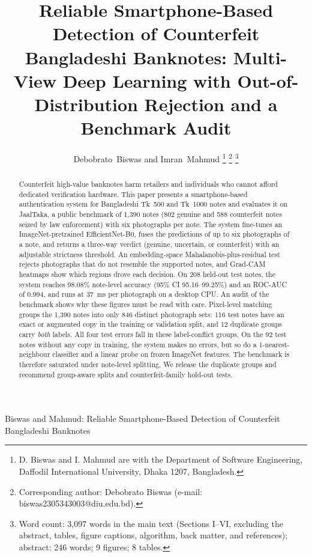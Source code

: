 \documentclass[journal]{IEEEtran}
\begin{document}
\title{Reliable Smartphone-Based Detection of Counterfeit Bangladeshi Banknotes:
Multi-View Deep Learning with Out-of-Distribution Rejection and a Benchmark Audit}

\author{Debobrato~Biswas and Imran~Mahmud%
\thanks{D. Biswas and I. Mahmud are with the Department of Software Engineering,
Daffodil International University, Dhaka 1207, Bangladesh.}%
\thanks{Corresponding author: Debobrato Biswas (e-mail: biswas2305343003@diu.edu.bd).}%
\thanks{Word count: 3{,}097 words in the main text (Sections I--VI, excluding the
abstract, tables, figure captions, algorithm, back matter, and references); abstract:
246 words; 9 figures; 8 tables.}}

%
{Biswas and Mahmud: Reliable Smartphone-Based Detection of Counterfeit Bangladeshi Banknotes}

\maketitle

\begin{abstract}
Counterfeit high-value banknotes harm retailers and individuals who cannot afford
dedicated verification hardware. This paper presents a smartphone-based authentication
system for Bangladeshi Tk~500 and Tk~1000 notes and evaluates it on JaalTaka, a public
benchmark of 1{,}390 notes (802 genuine and 588 counterfeit notes seized by law
enforcement) with six photographs per note. The system fine-tunes an ImageNet-pretrained
EfficientNet-B0, fuses the predictions of up to six photographs of a note, and returns
a three-way verdict (genuine, uncertain, or counterfeit) with an adjustable strictness
threshold. An embedding-space Mahalanobis-plus-residual test rejects
photographs that do not resemble the supported notes, and Grad-CAM heatmaps show which
regions drove each decision. On 208 held-out test notes, the system reaches 98.08\%
note-level accuracy (95\% CI 95.16--99.25\%) and an ROC-AUC of 0.994, and runs at
37~ms per photograph on a desktop CPU. An audit of the benchmark shows why these figures
must be read with care. Pixel-level matching groups the 1{,}390 notes into only 846
distinct photograph sets: 116 test notes have an exact or augmented copy in
the training or validation split, and 12 duplicate groups carry \emph{both} labels. All
four test errors fall in these label-conflict groups. On the 92 test notes without any
copy in training, the system makes no errors, but so do a 1-nearest-neighbour classifier
and a linear probe on frozen ImageNet features. The benchmark is therefore saturated
under note-level splitting. We release the duplicate groups and recommend group-aware
splits and counterfeit-family hold-out tests.
\end{abstract}
\end{document}
